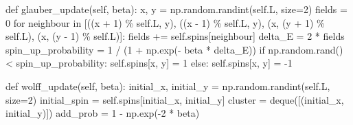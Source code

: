 \documentclass[
  letterpaper,
  DIV=11,
  numbers=noendperiod]{scrreprt}
\newenvironment{Shaded}{\begin{snugshade}}{\end{snugshade}}
\newcommand{\ControlFlowTok}[1]{\textcolor[rgb]{0.00,0.23,0.31}{#1}}
\newcommand{\DecValTok}[1]{\textcolor[rgb]{0.68,0.00,0.00}{#1}}
\newcommand{\KeywordTok}[1]{\textcolor[rgb]{0.00,0.23,0.31}{#1}}
\newcommand{\NormalTok}[1]{\textcolor[rgb]{0.00,0.23,0.31}{#1}}
\newcommand{\OperatorTok}[1]{\textcolor[rgb]{0.37,0.37,0.37}{#1}}
\newcommand{\VariableTok}[1]{\textcolor[rgb]{0.07,0.07,0.07}{#1}}
\theoremstyle{definition}
\theoremstyle{remark}
\begin{document}
\begin{Shaded}
\begin{Highlighting}[]
    \KeywordTok{def}\NormalTok{ glauber\_update(}\VariableTok{self}\NormalTok{, beta):}
\NormalTok{        x, y }\OperatorTok{=}\NormalTok{ np.random.randint(}\VariableTok{self}\NormalTok{.L, size}\OperatorTok{=}\DecValTok{2}\NormalTok{)}
\NormalTok{        fields }\OperatorTok{=} \DecValTok{0}
        \ControlFlowTok{for}\NormalTok{ neighbour }\KeywordTok{in}\NormalTok{ [((x }\OperatorTok{+} \DecValTok{1}\NormalTok{) }\OperatorTok{\%} \VariableTok{self}\NormalTok{.L, y), ((x }\OperatorTok{{-}} \DecValTok{1}\NormalTok{) }\OperatorTok{\%} \VariableTok{self}\NormalTok{.L, y), (x, (y }\OperatorTok{+} \DecValTok{1}\NormalTok{) }\OperatorTok{\%} \VariableTok{self}\NormalTok{.L), (x, (y }\OperatorTok{{-}} \DecValTok{1}\NormalTok{) }\OperatorTok{\%} \VariableTok{self}\NormalTok{.L)]:}
\NormalTok{            fields }\OperatorTok{+=} \VariableTok{self}\NormalTok{.spins[neighbour]}
\NormalTok{        delta\_E }\OperatorTok{=} \DecValTok{2} \OperatorTok{*}\NormalTok{ fields}
\NormalTok{        spin\_up\_probability }\OperatorTok{=} \DecValTok{1} \OperatorTok{/}\NormalTok{ (}\DecValTok{1} \OperatorTok{+}\NormalTok{ np.exp(}\OperatorTok{{-}}\NormalTok{ beta }\OperatorTok{*}\NormalTok{ delta\_E))        }
        \ControlFlowTok{if}\NormalTok{ np.random.rand() }\OperatorTok{\textless{}}\NormalTok{ spin\_up\_probability:}
            \VariableTok{self}\NormalTok{.spins[x, y] }\OperatorTok{=} \DecValTok{1}
        \ControlFlowTok{else}\NormalTok{:}
            \VariableTok{self}\NormalTok{.spins[x, y] }\OperatorTok{=} \OperatorTok{{-}}\DecValTok{1}

    \KeywordTok{def}\NormalTok{ wolff\_update(}\VariableTok{self}\NormalTok{, beta):}
\NormalTok{        initial\_x, initial\_y }\OperatorTok{=}\NormalTok{ np.random.randint(}\VariableTok{self}\NormalTok{.L, size}\OperatorTok{=}\DecValTok{2}\NormalTok{)}
\NormalTok{        initial\_spin }\OperatorTok{=} \VariableTok{self}\NormalTok{.spins[initial\_x, initial\_y]}
\NormalTok{        cluster }\OperatorTok{=}\NormalTok{ deque([(initial\_x, initial\_y)])}
\NormalTok{        add\_prob }\OperatorTok{=} \DecValTok{1} \OperatorTok{{-}}\NormalTok{ np.exp(}\OperatorTok{{-}}\DecValTok{2} \OperatorTok{*}\NormalTok{ beta)}


\end{Highlighting}
\end{Shaded}
\end{document}
